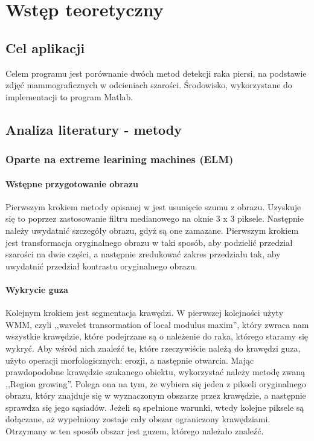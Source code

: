 \documentclass[11pt,openany]{sprawozdanie-agh}
\begin{document}

\stronatytulowa{}

\tableofcontents

\clearpage

\section{Wstęp teoretyczny}
\subsection{Cel aplikacji}
Celem programu jest porównanie dwóch metod detekcji raka piersi, na podstawie zdjęć mammograficznych w odcieniach szarości. Środowisko, wykorzystane do implementacji to program Matlab.

\subsection{Analiza literatury - metody}
\subsubsection{Oparte na extreme learining machines (ELM)}
\paragraph{Wstępne przygotowanie obrazu\\}
Pierwszym krokiem metody opisanej w \cite{Wang2014} jest usunięcie szumu z obrazu. Uzyskuje się to poprzez zastosowanie filtru medianowego na oknie 3 x 3 piksele. Następnie należy uwydatnić szczegóły obrazu, gdyż są one zamazane. Pierwszym krokiem jest transformacja oryginalnego obrazu w taki sposób, aby podzielić przedział szarości na dwie części, a następnie zredukować zakres przedziału tak, aby uwydatnić przedział kontrastu oryginalnego obrazu.

\paragraph{Wykrycie guza\\}
Kolejnym krokiem jest segmentacja krawędzi. W pierwszej kolejności użyty WMM, czyli ,,wavelet transormation of local modulus maxim'', który zwraca nam wszystkie krawędzie, które podejrzane są o należenie do raka, którego staramy się wykryć. Aby wśród nich znaleźć te, które rzeczywiście należą do krawędzi guza, użyto operacji morfologicznych: erozji, a następnie otwarcia. Mając prawdopodobne krawędzie szukanego obiektu, wykorzystać należy metodę zwaną ,,Region growing''. Polega ona na tym, że wybiera się jeden z pikseli oryginalnego obrazu, który znajduje się w wyznaczonym obszarze przez krawędzie, a następnie sprawdza się jego sąsiadów. Jeżeli są spełnione warunki, wtedy kolejne piksele są dołączane, aż wypełniony zostaje cały obszar ograniczony krawędziami. Otrzymany w ten sposób obszar jest guzem, którego należało znaleźć.
\end{document}
